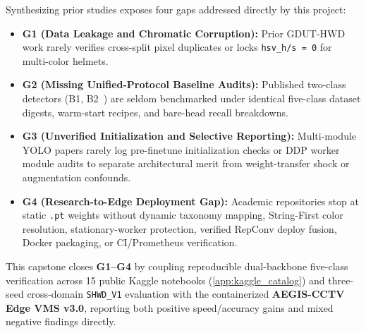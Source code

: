 Synthesizing prior studies exposes four gaps addressed directly by this project:
\begin{itemize}[leftmargin=1.8em, itemsep=2.5pt]
  \item \textbf{G1 (Data Leakage and Chromatic Corruption):} Prior GDUT-HWD work rarely verifies cross-split pixel duplicates or locks \texttt{hsv\_h/s = 0} for multi-color helmets.
  \item \textbf{G2 (Missing Unified-Protocol Baseline Audits):} Published two-class detectors (B1, B2~\cite{zhao2025yolodcrcf,song2024improved}) are seldom benchmarked under identical five-class dataset digests, warm-start recipes, and bare-head recall breakdowns.
  \item \textbf{G3 (Unverified Initialization and Selective Reporting):} Multi-module YOLO papers rarely log pre-finetune initialization checks or DDP worker module audits to separate architectural merit from weight-transfer shock or augmentation confounds.
  \item \textbf{G4 (Research-to-Edge Deployment Gap):} Academic repositories stop at static \texttt{.pt} weights without dynamic taxonomy mapping, String-First color resolution, stationary-worker protection, verified RepConv deploy fusion, Docker packaging, or CI/Prometheus verification.
\end{itemize}

This capstone closes \textbf{G1--G4} by coupling reproducible dual-backbone five-class verification across 15 public Kaggle notebooks (\ref{app:kaggle_catalog}) and three-seed cross-domain \texttt{SHWD\_V1} evaluation with the containerized \textbf{AEGIS-CCTV Edge VMS v3.0}, reporting both positive speed/accuracy gains and mixed negative findings directly.
